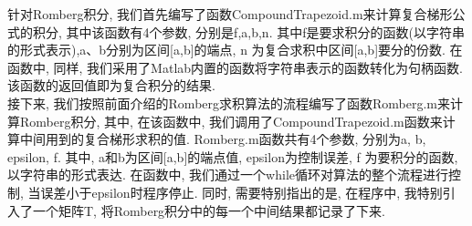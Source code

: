 \documentclass[a4paper]{article}
\begin{document}
\begin{spacing}{1.5}
\begin{CJK*}{GBK}{song}
针对Romberg积分, 我们首先编写了函数CompoundTrapezoid.m来计算复合梯形公式的积分, 其中该函数有4个参数, 分别是f,a,b,n. 其中f是要求积分的函数(以字符串的形式表示),a、b分别为区间[a,b]的端点, n 为复合求积中区间[a,b]要分的份数. 在函数中, 同样, 我们采用了Matlab内置的函数将字符串表示的函数转化为句柄函数.该函数的返回值即为复合积分的结果.\\
接下来, 我们按照前面介绍的Romberg求积算法的流程编写了函数Romberg.m来计算Romberg积分, 其中, 在该函数中, 我们调用了CompoundTrapezoid.m函数来计算中间用到的复合梯形求积的值. Romberg.m函数共有4个参数, 分别为a, b, epsilon, f. 其中, a和b为区间[a,b]的端点值, epsilon为控制误差, f 为要积分的函数, 以字符串的形式表达. 在函数中, 我们通过一个while循环对算法的整个流程进行控制, 当误差小于epsilon时程序停止. 同时, 需要特别指出的是, 在程序中, 我特别引入了一个矩阵T, 将Romberg积分中的每一个中间结果都记录了下来.


\end{CJK*}
\end{spacing}
\end{document}
